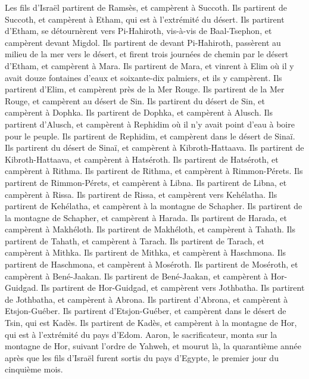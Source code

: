 \begin{multicols}{2}
Les fils d'Israël partirent de Ramsès, et campèrent à Succoth.
Ils partirent de Succoth, et campèrent à Etham, qui est à l’extrémité du désert.
Ils partirent d'Etham, se détournèrent vers Pi-Hahiroth, vis-à-vis de Baal-Tsephon, et campèrent devant Migdol.
Ils partirent de devant Pi-Hahiroth, passèrent au milieu de la mer vers le désert, et firent trois journées de chemin par le désert d'Etham, et campèrent à Mara.
Ils partirent de Mara, et vinrent à Elim où il y avait douze fontaines d'eaux et soixante-dix palmiers, et ils y campèrent.
Ils partirent d'Elim, et campèrent près de la Mer Rouge.
Ils partirent de la Mer Rouge, et campèrent au désert de Sin.
Ils partirent du désert de Sin, et campèrent à Dophka.
Ils partirent de Dophka, et campèrent à Alusch.
Ils partirent d'Alusch, et campèrent à Rephidim où il n'y avait point d'eau à boire pour le peuple.
Ils partirent de Rephidim, et campèrent dans le désert de Sinaï.
Ils partirent du désert de Sinaï, et campèrent à Kibroth-Hattaava.
Ils partirent de Kibroth-Hattaava, et campèrent à Hatséroth.
Ils partirent de Hatséroth, et campèrent à Rithma.
Ils partirent de Rithma, et campèrent à Rimmon-Pérets.
Ils partirent de Rimmon-Pérets, et campèrent à Libna.
Ils partirent de Libna, et campèrent à Rissa.
Ils partirent de Rissa, et campèrent vers Kehélatha.
Ils partirent de Kehélatha, et campèrent à la montagne de Schapher.
Ils partirent de la montagne de Schapher, et campèrent à Harada.
Ils partirent de Harada, et campèrent à Makhéloth.
Ils partirent de Makhéloth, et campèrent à Tahath.
Ils partirent de Tahath, et campèrent à Tarach.
Ils partirent de Tarach, et campèrent à Mithka.
Ils partirent de Mithka, et campèrent à Haschmona.
Ils partirent de Haschmona, et campèrent à Moséroth.
Ils partirent de Moséroth, et campèrent à Bené-Jaakan.
Ils partirent de Bené-Jaakan, et campèrent à Hor-Guidgad.
Ils partirent de Hor-Guidgad, et campèrent vers Jothbatha.
Ils partirent de Jothbatha, et campèrent à Abrona.
Ils partirent d’Abrona, et campèrent à Etsjon-Guéber.
Ils partirent d’Etsjon-Guéber, et campèrent dans le désert de Tsin, qui est Kadès.
Ils partirent de Kadès, et campèrent à la montagne de Hor, qui est à l’extrémité du pays d'Edom.
Aaron, le sacrificateur, monta sur la montagne de Hor, suivant l’ordre de Yahweh, et mourut là, la quarantième année après que les fils d'Israël furent sortis du pays d'Egypte, le premier jour du cinquième mois.

\end{multicols}
